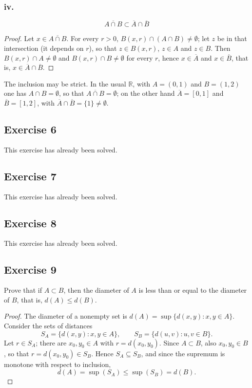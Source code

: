 \documentclass[11pt, a4paper]{article}
\begin{document}
\subsubsection*{iv.}
$$ \overline{A \cap B} \subset \overline{A} \cap \overline{B} $$

\begin{proof}
Let $x \in \overline{A \cap B}$. For every $r > 0$, $B(x, r) \cap (A \cap B) \neq \emptyset$; let
$z$ be in that intersection (it depends on $r$), so that $z \in B(x, r)$, $z \in A$ and $z \in B$.
Then $B(x, r) \cap A \neq \emptyset$ and $B(x, r) \cap B \neq \emptyset$ for every $r$, hence
$x \in \overline{A}$ and $x \in \overline{B}$, that is, $x \in \overline{A} \cap \overline{B}$.
\end{proof}

The inclusion may be strict. In the usual $\mathbb{R}$, with $A = (0, 1)$ and $B = (1, 2)$ one has
$A \cap B = \emptyset$, so that $\overline{A \cap B} = \emptyset$; on the other hand $\overline{A} = [0, 1]$
and $\overline{B} = [1, 2]$, with $\overline{A} \cap \overline{B} = \{1\} \neq \emptyset$.

\subsection*{Exercise 6}

This exercise has already been solved.

\subsection*{Exercise 7}

This exercise has already been solved.

\subsection*{Exercise 8}

This exercise has already been solved.

\subsection*{Exercise 9}

Prove that if $A \subset B$, then the diameter of $A$ is less than or equal to the diameter of $B$, that
is, $d(A) \le d(B)$.

\begin{proof}
The diameter of a nonempty set is $d(A) = \sup \{ d(x, y) : x, y \in A \}$. Consider the
sets of distances
$$ S_A = \{ d(x, y) : x, y \in A \}, \qquad S_B = \{ d(u, v) : u, v \in B \}. $$
Let $r \in S_A$; there are $x_0, y_0 \in A$ with $r = d(x_0, y_0)$. Since $A \subset B$, also
$x_0, y_0 \in B$, so that $r = d(x_0, y_0) \in S_B$. Hence $S_A \subseteq S_B$, and since the supremum is
monotone with respect to inclusion,
$$ d(A) = \sup(S_A) \le \sup(S_B) = d(B). $$
\end{proof}
\end{document}
